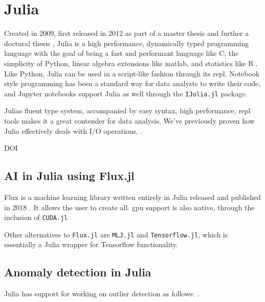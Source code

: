 \section{Julia}

Created in 2009, first released in 2012 as part of a master thesis \cite{juliaMs} and further a doctural thesis \cite{juliaPHD}, Julia is a high performance, dynamically typed programming language with the goal of being a fast and performant language like C, the simplicity of Python, linear algebra extensions like matlab, and statistics like R \cite{julia}.  \\ 

Like Python, Julia can be used in a script-like fashion through its \acrfull{repl}. Notebook style programming has been a standard way for data analysts to write their code, and Jupyter notebooks support Julia as well through the \texttt{IJulia.jl} package. 

Julias fluent type system, accompanied by easy syntax, high performance, \acrshort{repl} tools makes it a great contender for data analysis. We've previously proven how Julia effectively deals with I/O operations, \cite{projthesis}.


DOI \cite{doi:10.1137/141000671}

\subsection{AI in Julia using Flux.jl}
\label{back:flux}

Flux is a machine learning library written entirely in Julia released and published in 2018 \cite{Flux.jl-2018} \cite{Innes2018}. It allows the user to create all. \acrshort{gpu} support is also native, through the inclusion of \texttt{CUDA.jl}

Other alternatives to \texttt{Flux.jl} are \texttt{MLJ.jl} and \texttt{Tensorflow.jl}, which is essentially a Julia wrapper for Tensorflow functionality. 

\subsection{Anomaly detection in Julia}

Julia has support for working on outlier detection as follows: \cite{muhr2022outlierdetectionjl}.





